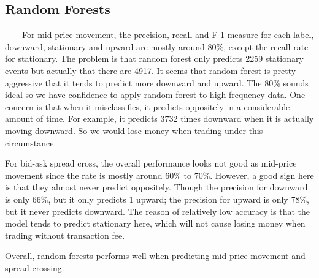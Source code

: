 \documentclass[11pt]{article}
\begin{document}
\subsection{Random Forests}
\ \ \ \ For mid-price movement, the precision, recall and F-1 measure for each label, downward, stationary and upward are mostly around 80\%, except the recall rate for stationary. The problem is that random forest only predicts 2259 stationary events but actually that there are 4917. It seems that random forest is pretty aggressive that it tends to predict more downward and upward. The 80\% sounds ideal so we have confidence to apply random forest to high frequency data. One concern is that when it misclassifies, it predicts oppositely in a considerable amount of time. For example, it predicts 3732 times downward when it is actually moving downward. So we would lose money when trading under this circumstance.
\par 
For bid-ask spread cross, the overall performance looks not good as mid-price movement since the rate is mostly around 60\% to 70\%. However, a good sign here is that they almost never predict oppositely. Though the precision for downward is only 66\%, but it only predicts 1 upward; the precision for upward is only 78\%, but it never predicts downward. The reason of relatively low accuracy is that the model tends to predict stationary here, which will not cause losing money when trading without transaction fee.
\par 
Overall, random forests performs well when predicting mid-price movement and spread crossing.
\begin{table} [!htb]
  \small
\caption{Random Forest: Mid-Price Movement Confusion Matrix}
\centering
{}
  \end{table}
  \begin{table} [!htb]
    \small
\caption{Random Forest: Mid-Price Movement Measures}
\centering
{}
  \end{table}
\end{document}
